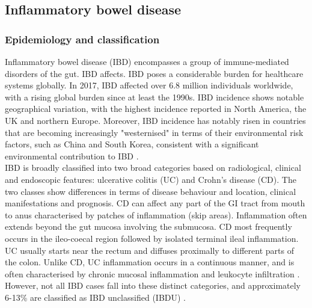 \subsection{Inflammatory bowel disease}
\subsubsection{Epidemiology and classification}
Inflammatory bowel disease (IBD) encompasses a group of immune-mediated disorders of the gut. IBD affects. IBD poses a considerable burden for healthcare systems globally. In 2017, IBD affected over 6.8 million individuals worldwide, with a rising global burden since at least the 1990s. IBD incidence shows notable geographical variation, with the highest incidence reported in North America, the UK and northern Europe. Moreover, IBD incidence has notably risen in countries that are becoming increasingly "westernised" in terms of their environmental risk factors, such as China and South Korea, consistent with a significant environmental contribution to IBD \cite{Ng2013-of}.\\

IBD is broadly classified into two broad categories based on radiological, clinical and endoscopic features: ulcerative colitis (UC) and Crohn's disease (CD). The two classes show differences in terms of disease behaviour and location, clinical manifestations and prognosis. CD can affect any part of the GI tract from mouth to anus characterised by patches of inflammation (skip areas). Inflammation often extends beyond the gut mucosa involving the submucosa. CD most frequently occurs in the ileo-coecal region followed by isolated terminal ileal inflammation. UC usually starts near the rectum and diffuses proximally to different parts of the colon. Unlike CD, UC inflammation occurs in a continuous manner, and is often characterised by chronic mucosal inflammation and leukocyte infiltration \cite{Hendrickson2002-ky}. However, not all IBD cases fall into these distinct categories, and approximately 6-13\% are classified as IBD unclassified (IBDU) \cite{Thurgate2019-xj}.\\

